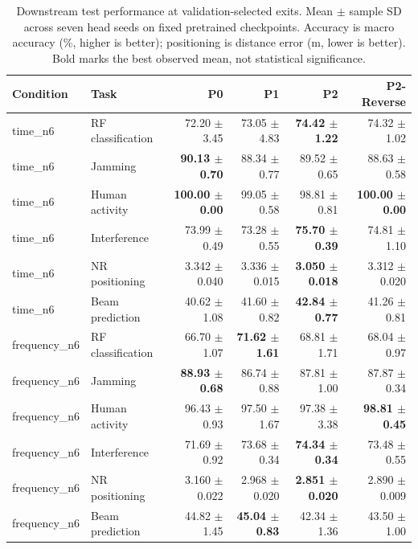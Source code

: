 \begin{table}[t]
\centering
\caption{Downstream test performance at validation-selected exits. Mean $\pm$ sample SD across seven head seeds on fixed pretrained checkpoints. Accuracy is macro accuracy (\%, higher is better); positioning is distance error (m, lower is better). Bold marks the best observed mean, not statistical significance.}
\begin{tabular}{llrrrr}
\hline
Condition & Task & P0 & P1 & P2 & P2-Reverse \\
\hline
time\_n6 & RF classification & 72.20 $\pm$ 3.45 & 73.05 $\pm$ 4.83 & \textbf{74.42 $\pm$ 1.22} & 74.32 $\pm$ 1.02 \\
time\_n6 & Jamming & \textbf{90.13 $\pm$ 0.70} & 88.34 $\pm$ 0.77 & 89.52 $\pm$ 0.65 & 88.63 $\pm$ 0.58 \\
time\_n6 & Human activity & \textbf{100.00 $\pm$ 0.00} & 99.05 $\pm$ 0.58 & 98.81 $\pm$ 0.81 & \textbf{100.00 $\pm$ 0.00} \\
time\_n6 & Interference & 73.99 $\pm$ 0.49 & 73.28 $\pm$ 0.55 & \textbf{75.70 $\pm$ 0.39} & 74.81 $\pm$ 1.10 \\
time\_n6 & NR positioning & 3.342 $\pm$ 0.040 & 3.336 $\pm$ 0.015 & \textbf{3.050 $\pm$ 0.018} & 3.312 $\pm$ 0.020 \\
time\_n6 & Beam prediction & 40.62 $\pm$ 1.08 & 41.60 $\pm$ 0.82 & \textbf{42.84 $\pm$ 0.77} & 41.26 $\pm$ 0.81 \\
\hline
frequency\_n6 & RF classification & 66.70 $\pm$ 1.07 & \textbf{71.62 $\pm$ 1.61} & 68.81 $\pm$ 1.71 & 68.04 $\pm$ 0.97 \\
frequency\_n6 & Jamming & \textbf{88.93 $\pm$ 0.68} & 86.74 $\pm$ 0.88 & 87.81 $\pm$ 1.00 & 87.87 $\pm$ 0.34 \\
frequency\_n6 & Human activity & 96.43 $\pm$ 0.93 & 97.50 $\pm$ 1.67 & 97.38 $\pm$ 3.38 & \textbf{98.81 $\pm$ 0.45} \\
frequency\_n6 & Interference & 71.69 $\pm$ 0.92 & 73.68 $\pm$ 0.34 & \textbf{74.34 $\pm$ 0.34} & 73.48 $\pm$ 0.55 \\
frequency\_n6 & NR positioning & 3.160 $\pm$ 0.022 & 2.968 $\pm$ 0.020 & \textbf{2.851 $\pm$ 0.020} & 2.890 $\pm$ 0.009 \\
frequency\_n6 & Beam prediction & 44.82 $\pm$ 1.45 & \textbf{45.04 $\pm$ 0.83} & 42.34 $\pm$ 1.36 & 43.50 $\pm$ 1.00 \\
\hline
\end{tabular}
\end{table}

